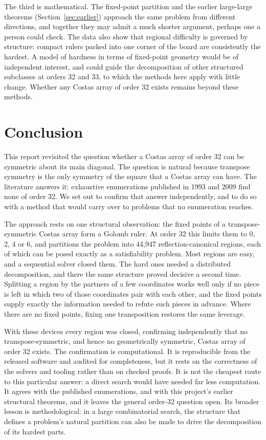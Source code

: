 \documentclass[11pt,a4paper]{article}
\theoremstyle{definition}
\begin{document}
The third is mathematical. The fixed-point partition and the earlier large-large theorems
(Section~\ref{sec:earlier}) approach the same problem from different directions, and together
they may admit a much shorter argument, perhaps one a person could check. The data also show that
regional difficulty is governed by structure: compact rulers packed into one corner of the board
are consistently the hardest. A model of hardness in terms of fixed-point geometry would be of
independent interest, and could guide the decomposition of other structured subclasses at orders
32 and 33, to which the methods here apply with little change. Whether any Costas array of order
32 exists remains beyond these methods.

\section{Conclusion}

This report revisited the question whether a Costas array of order 32 can be symmetric about its
main diagonal. The question is natural because transpose symmetry is the only symmetry of the
square that a Costas array can have. The literature answers it: exhaustive enumerations published
in 1993 and 2009 find none of order 32. We set out to confirm that answer independently, and to do so with
a method that would carry over to problems that no enumeration reaches.

The approach rests on one structural observation: the fixed points of a transpose-symmetric
Costas array form a Golomb ruler. At order 32 this limits them to 0, 2, 4 or 6, and partitions the
problem into 44{,}947 reflection-canonical regions, each of which can be posed exactly as a
satisfiability problem. Most regions are easy, and a sequential solver closed them. The hard ones
needed a distributed decomposition, and there the same structure proved decisive a second time.
Splitting a region by the partners of a few coordinates works well only if no piece is left in
which two of those coordinates pair with each other, and the fixed points supply exactly the
information needed to refute such pieces in advance. Where there are no fixed points, fixing one
transposition restores the same leverage.

With these devices every region was closed, confirming independently that no transpose-symmetric,
and hence no geometrically symmetric, Costas array of order 32 exists. The confirmation is computational. It is
reproducible from the released software and audited for completeness, but it rests on the
correctness of the solvers and tooling rather than on checked proofs. It is not the cheapest route
to this particular answer: a direct search would have needed far less computation. It agrees with the published enumerations,
and with this project's earlier structural theorems, and it leaves the general order-32 question
open. Its broader lesson is methodological: in a large combinatorial search, the structure that
defines a problem's natural partition can also be made to drive the decomposition of its hardest
parts.
\end{document}
